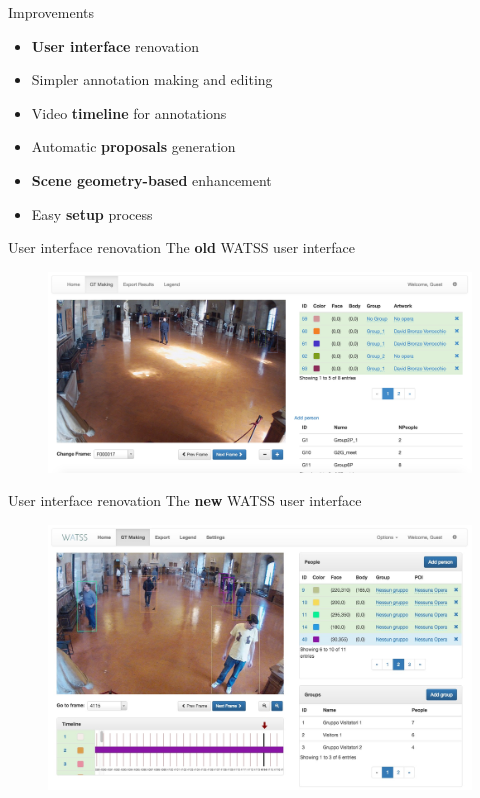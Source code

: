 \documentclass{beamer}
\begin{document}
\begin{tframe}{Improvements}
\begin{itemize}
\vspace{0.3cm}
\item \textbf{User interface} renovation
\vspace{0.2cm}
\item Simpler annotation making and editing
\vspace{0.2cm}
\item Video \textbf{timeline} for annotations
\vspace{0.2cm}
\item Automatic \textbf{proposals} generation
\vspace{0.2cm}
\item \textbf{Scene geometry-based} enhancement
\vspace{0.2cm}
\item Easy \textbf{setup} process
\end{itemize}
\end{tframe}

\begin{tframe}{User interface renovation}
The \textbf{old} WATSS user interface
\begin{figure}[h]
\centering
\includegraphics[width=1\textwidth]{images/watss_old.jpg}
\end{figure}
\end{tframe}

\begin{tframe}{User interface renovation}
The \textbf{new} WATSS user interface
\begin{figure}[h]
\centering
\includegraphics[scale=0.22]{images/watss-gui.jpg}
\end{figure}
\end{tframe}
\end{document}
